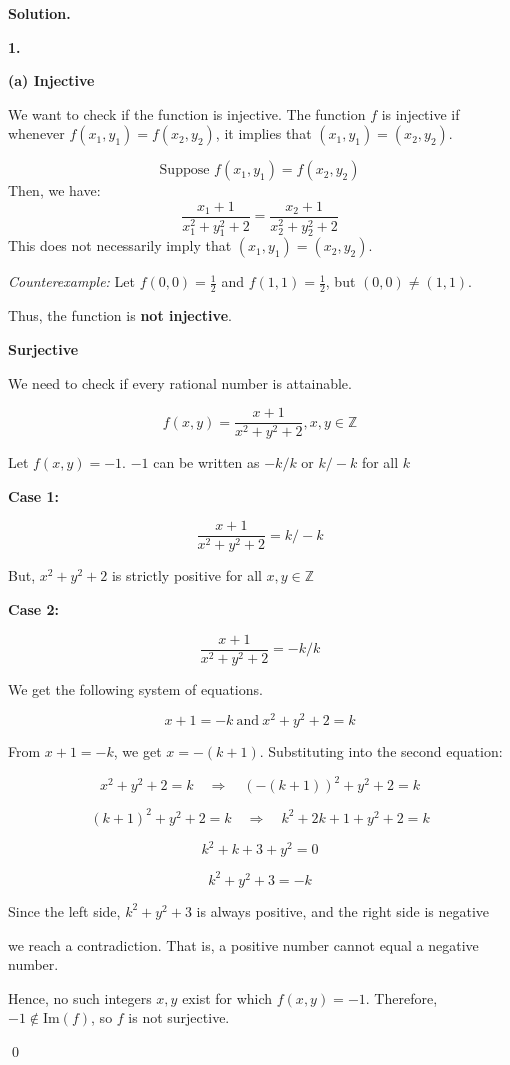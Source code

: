 \documentclass[12pt]{article}
\newenvironment{solution}{%
	\par\medskip
	\noindent\textbf{Solution.}\par\nopagebreak
}{%
	\hfill \qed \par\medskip
}
\begin{document}
	\begin{solution}
		
		\textbf{1.}
		
\textbf{(a) Injective}

We want to check if the function is injective. The function $f$ is injective if whenever $f(x_1, y_1) = f(x_2, y_2)$, it implies that $(x_1, y_1) = (x_2, y_2)$. 

$$\text{Suppose } f(x_1, y_1) = f(x_2, y_2)$$
Then, we have:
$$\frac{x_1 + 1}{x_1^2 + y_1^2 + 2} = \frac{x_2 + 1}{x_2^2 + y_2^2 + 2}$$
This does not necessarily imply that $(x_1, y_1) = (x_2, y_2)$.

\textit{Counterexample:}
Let $f(0, 0) = \frac{1}{2}$ and $f(1, 1) = \frac{1}{2}$, but $(0, 0) \neq (1, 1)$.

Thus, the function is \textbf{not injective}.

\textbf{Surjective}

We need to check if every rational number is attainable.

$$f(x,y) = \frac{x+1}{x^2 + y^2 + 2}, x,y \in \mathbb{Z}$$

Let $f(x,y) = -1$. $-1$ can be written as $-k/k$ or $k/-k$ for all $k$

\textbf{Case 1: } 

$$\frac{x+1}{x^2+y^2+2} = k/-k$$

But, $x^2 + y^2 + 2$ is strictly positive for all $x,y \in \mathbb{Z}$

\textbf{Case 2: }

$$\frac{x+1}{x^2+y^2+2} = -k/k$$

We get the following system of equations.

$$x+ 1 = -k \ \text{and} \ x^2 + y^2 + 2 = k$$

From \( x + 1 = -k \), we get \( x = -(k + 1) \). Substituting into the second equation:

\[
x^2 + y^2 + 2 = k \quad \Rightarrow \quad (-(k + 1))^2 + y^2 + 2 = k
\]

\[
(k + 1)^2 + y^2 + 2 = k \quad \Rightarrow \quad k^2 + 2k + 1 + y^2 + 2 = k
\]

\[
k^2 + k + 3 + y^2 = 0
\]

\[
k^2 + y^2 + 3 = -k
\]

Since the left side, $k^2 + y^2 + 3$ is always positive, and the right side is negative

we reach a contradiction. That is, a positive number cannot equal a negative number.

Hence, no such integers \(x, y\) exist for which \(f(x, y) = -1\). Therefore, \(-1 \notin \text{Im}(f)\), so \(f\) is not surjective.


\end{solution}
\end{document}
